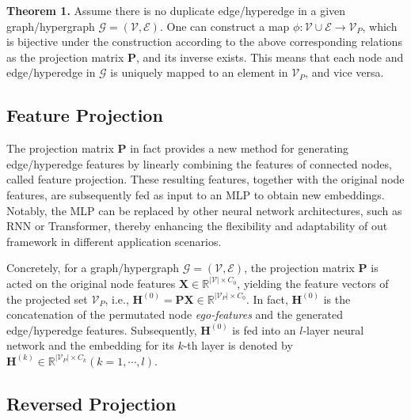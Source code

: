 \documentclass[review]{elsarticle}
\begin{document}
\textbf{Theorem 1.} Assume there is no duplicate edge/hyperedge in a given graph/hypergraph $\mathcal{G}=(\mathcal{V},\mathcal{E})$. One can construct a map $\phi:\mathcal{V}\cup\mathcal{E}\to\mathcal{V}_P$, which is bijective under the construction according to the above corresponding relations as the projection matrix $\mathbf{P}$, and its inverse exists. This means that each node and edge/hyperedge in $\mathcal{G}$ is uniquely mapped to an element in $\mathcal{V}_P$, and vice versa.







\subsection{Feature Projection}

The projection matrix $\mathbf{P}$ in fact provides a new method for generating edge/hyperedge features by linearly combining the features of connected nodes, called feature projection. These resulting features, together with the original node features, are subsequently fed as input to an MLP to obtain new embeddings. Notably, the MLP can be replaced by other neural network architectures, such as RNN or Transformer, thereby enhancing the flexibility and adaptability of out framework in different application scenarios.

Concretely, for a graph/hypergraph $\mathcal{G}=(\mathcal{V},\mathcal{E})$, the projection matrix $\mathbf{P}$ is acted on the original node features $\mathbf{X}\in\mathbb{R}^{|\mathcal{V}|\times{C_0}}$, yielding the feature vectors of the projected set $\mathcal{V}_P$, i.e., $\mathbf{H}^{(0)}=\mathbf{P}\mathbf{X}\in\mathbb{R}^{|\mathcal{V}_{P}|\times C_{0}}$. In fact, $\mathbf{H}^{(0)}$ is the concatenation of the permutated node \textit{ego-features} and the generated edge/hyperedge features. Subsequently, $\mathbf{H}^{(0)}$ is fed into an $l$-layer neural network and the embedding for its $k$-th layer is denoted by $\mathbf{H}^{(k)}\in\mathbb{R}^{|\mathcal{V}_P|\times C_k} (k=1,\cdots,l)$.

\subsection{Reversed Projection}
\end{document}
